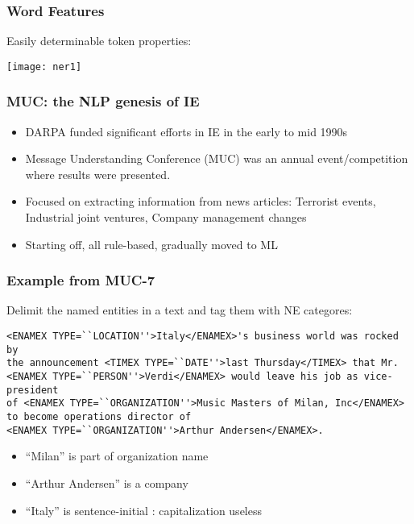 \begin{frame}[fragile]\frametitle{Word Features}
Easily determinable token properties:
\begin{center}
\texttt{[image: ner1]}
\end{center}
\end{frame}

\begin{frame}[fragile]\frametitle{MUC: the NLP genesis of IE}
  \begin{itemize}
  \item DARPA funded significant efforts in IE in the early to mid 1990s
  \item Message Understanding Conference (MUC) was an annual event/competition where results were presented.
  \item Focused on extracting information from news articles: Terrorist events, Industrial joint ventures, Company management changes
  \item Starting off, all rule-based, gradually moved to ML
  \end{itemize}
\end{frame}

\begin{frame}[fragile]\frametitle{Example from MUC-7}
Delimit the named entities in a text and tag them with NE categores:

  \begin{lstlisting}
<ENAMEX TYPE=``LOCATION''>Italy</ENAMEX>'s business world was rocked by
the announcement <TIMEX TYPE=``DATE''>last Thursday</TIMEX> that Mr.
<ENAMEX TYPE=``PERSON''>Verdi</ENAMEX> would leave his job as vice-president
of <ENAMEX TYPE=``ORGANIZATION''>Music Masters of Milan, Inc</ENAMEX> 
to become operations director of  
<ENAMEX TYPE=``ORGANIZATION''>Arthur Andersen</ENAMEX>.
  \end{lstlisting}
  
  \begin{itemize}
  \item ``Milan'' is part of organization name
  \item ``Arthur Andersen'' is a company 
  \item ``Italy'' is sentence-initial : capitalization useless
  \end{itemize}
\end{frame}

